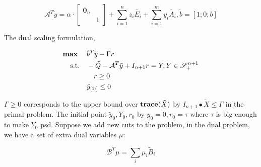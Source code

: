 \documentclass[../main]{subfiles}
\begin{document}
\begin{equation}
    \mathcal{A}^T \tilde y = \alpha \cdot \begin{bmatrix}  \bm 0_n &  \\  & 1  \end{bmatrix}
    + \sum_{i=1}^{n} z_{i} \tilde{E_i}
    + \sum_{i=1}^{m} y_{i} \tilde{A_i}, \tilde b = [1; 0; b]
\end{equation}

The dual scaling formulation,

\begin{equation} \label{eq:ws.dsdp.dual}
    \begin{aligned}
        \mathbf{max}\; \quad           & \tilde b^T \tilde y-\Gamma r                                              \\
        \mathrm{s.t.} \quad & - \tilde{Q}-\mathcal{A}^T \tilde y+I_{n+1} r= Y, Y \in \mathscr S^{n+1}_+ \\
                            & \quad r \ge 0                                                             \\
                            & \tilde y_{[1:]} \le 0
    \end{aligned}
\end{equation}

\(\Gamma \ge 0\) corresponds to the upper bound over \(\mathbf{trace}(\tilde X)\) by \(I_{n+1} \bullet \tilde X \le \Gamma\) in the primal problem. The initial point \(\tilde y_0, Y_0, r_0\) by \(y_0 = 0, r_0 = \tau\) where \(\tau\) is big enough to make \(Y_0\) psd.
Suppose we add new cuts to the problem, in the dual problem, we have a set of extra dual variables \(\mu\):

\begin{equation}
    \mathcal B^T\mu = \sum_i \mu_i \tilde B_i
\end{equation}
\end{document}
